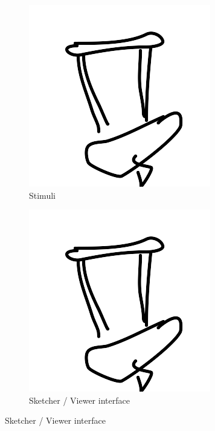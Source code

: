 \documentclass[10pt,letterpaper]{article}
\begin{document}
\begin{figure}
\begin{subfigure}{0.23\textwidth}
\includegraphics[width=\linewidth]{figures/fig_a.png}
\caption{Stimuli} \label{fig:1a}
\end{subfigure}
\hspace*{\fill}
\begin{subfigure}{0.23\textwidth}
\includegraphics[width=\linewidth]{figures/fig_b.png}
\caption{Sketcher / Viewer interface} \label{fig:1b}
\end{subfigure}
\end{figure}
\end{document}
